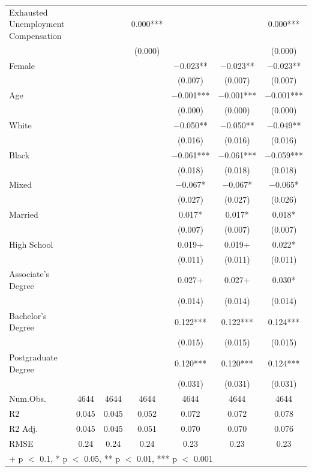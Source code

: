 \documentclass[
]{article}
\begin{document}
\begin{table}
{\begin{tabular}[t]{lcccccc}
Exhausted
Unemployment
Compensation &  &  & \num{0.000}*** &  &  & \num{0.000}***\\
 &  &  & (\num{0.000}) &  &  & (\num{0.000})\\
Female &  &  &  & \num{-0.023}** & \num{-0.023}** & \num{-0.023}**\\
 &  &  &  & (\num{0.007}) & (\num{0.007}) & \vphantom{1} (\num{0.007})\\
Age &  &  &  & \num{-0.001}*** & \num{-0.001}*** & \num{-0.001}***\\
 &  &  &  & (\num{0.000}) & (\num{0.000}) & (\num{0.000})\\
White &  &  &  & \num{-0.050}** & \num{-0.050}** & \num{-0.049}**\\
 &  &  &  & (\num{0.016}) & (\num{0.016}) & (\num{0.016})\\
Black &  &  &  & \num{-0.061}*** & \num{-0.061}*** & \num{-0.059}***\\
 &  &  &  & (\num{0.018}) & (\num{0.018}) & (\num{0.018})\\
Mixed &  &  &  & \num{-0.067}* & \num{-0.067}* & \num{-0.065}*\\
 &  &  &  & (\num{0.027}) & (\num{0.027}) & (\num{0.026})\\
Married &  &  &  & \num{0.017}* & \num{0.017}* & \num{0.018}*\\
 &  &  &  & (\num{0.007}) & (\num{0.007}) & (\num{0.007})\\
High
School &  &  &  & \num{0.019}+ & \num{0.019}+ & \num{0.022}*\\
 &  &  &  & (\num{0.011}) & (\num{0.011}) & (\num{0.011})\\
Associate's
Degree &  &  &  & \num{0.027}+ & \num{0.027}+ & \num{0.030}*\\
 &  &  &  & (\num{0.014}) & (\num{0.014}) & (\num{0.014})\\
Bachelor's
Degree &  &  &  & \num{0.122}*** & \num{0.122}*** & \num{0.124}***\\
 &  &  &  & (\num{0.015}) & (\num{0.015}) & (\num{0.015})\\
Postgraduate
Degree &  &  &  & \num{0.120}*** & \num{0.120}*** & \num{0.124}***\\
 &  &  &  & (\num{0.031}) & (\num{0.031}) & (\num{0.031})\\
\midrule
Num.Obs. & \num{4644} & \num{4644} & \num{4644} & \num{4644} & \num{4644} & \num{4644}\\
R2 & \num{0.045} & \num{0.045} & \num{0.052} & \num{0.072} & \num{0.072} & \num{0.078}\\
R2 Adj. & \num{0.045} & \num{0.045} & \num{0.051} & \num{0.070} & \num{0.070} & \num{0.076}\\
RMSE & \num{0.24} & \num{0.24} & \num{0.24} & \num{0.23} & \num{0.23} & \num{0.23}\\
\bottomrule
\multicolumn{7}{l}{\rule{0pt}{1em}+ p $<$ 0.1, * p $<$ 0.05, ** p $<$ 0.01, *** p $<$ 0.001}\\
\end{tabular}}
\end{table}
\end{document}
